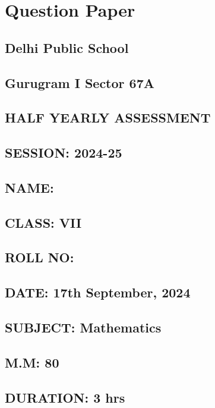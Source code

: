 \documentclass[11pt]{article}
\date{\today}
\title{}
\begin{document}
\section*{Question Paper}
\label{sec:org81701c2}

\subsection*{Delhi Public School}
\label{sec:org1678958}
\subsection*{Gurugram I Sector 67A}
\label{sec:orge7ad3d6}

\subsection*{HALF YEARLY ASSESSMENT}
\label{sec:org79ed952}
\subsection*{SESSION: 2024-25}
\label{sec:orge16b49c}

\subsection*{NAME:}
\label{sec:org32dd2f4}
\subsection*{CLASS: VII}
\label{sec:orgcc6ce39}
\subsection*{ROLL NO:}
\label{sec:org146fc5f}

\subsection*{DATE: 17th September, 2024}
\label{sec:orgcaadcf2}
\subsection*{SUBJECT: Mathematics}
\label{sec:orge9a69bc}
\subsection*{M.M: 80}
\label{sec:org3241880}
\subsection*{DURATION: 3 hrs}
\label{sec:org915597d}
\end{document}
